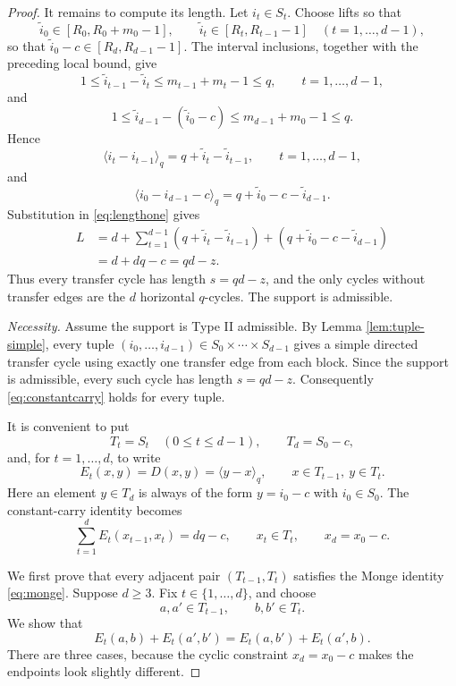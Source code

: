 \documentclass[11pt]{article}
\theoremstyle{definition}
\theoremstyle{remark}
\begin{document}
\begin{proof}
It remains to compute its length.  Let $i_t\in S_t$.  Choose lifts so that
\[
        \widetilde i_0\in [R_0,R_0+m_0-1],
        \qquad
        \widetilde i_t\in [R_t,R_{t-1}-1]\quad(t=1,\ldots,d-1),
\]
so that $\widetilde i_0-c\in [R_d,R_{d-1}-1]$. The interval inclusions, together with the preceding local bound, give
\[
        1\le \widetilde i_{t-1}-\widetilde i_t
        \le m_{t-1}+m_t-1\le q,
        \qquad t=1,\ldots,d-1,
\]
and
\[
        1\le \widetilde i_{d-1}-(\widetilde i_0-c)
        \le m_{d-1}+m_0-1\le q.
\]
Hence
\[
        \langle i_t-i_{t-1}\rangle_q=q+\widetilde i_t-\widetilde i_{t-1},
        \qquad t=1,\ldots,d-1,
\]
and
\[
        \langle i_0-i_{d-1}-c\rangle_q=q+\widetilde i_0-c-\widetilde i_{d-1}.
\]
Substitution in \eqref{eq:lengthone} gives
\[
\begin{aligned}
        L
        &=d+\sum_{t=1}^{d-1}(q+\widetilde i_t-\widetilde i_{t-1})
          +(q+\widetilde i_0-c-\widetilde i_{d-1})  \\
        &=d+dq-c
        =qd-z .
\end{aligned}
\]
Thus every transfer cycle has length $s=qd-z$, and the only cycles without transfer edges are the $d$ horizontal $q$-cycles.  The support is admissible.

\medskip
\noindent\emph{Necessity.}
Assume the support is Type II admissible.  By Lemma \ref{lem:tuple-simple}, every tuple $(i_0,\ldots,i_{d-1})\in S_0\times\cdots\times S_{d-1}$ gives a simple directed transfer cycle using exactly one transfer edge from each block.  Since the support is admissible, every such cycle has length $s=qd-z$.  Consequently \eqref{eq:constantcarry} holds for every tuple.

It is convenient to put
\[
        T_t=S_t\quad(0\le t\le d-1),
        \qquad
        T_d=S_0-c,
\]
and, for $t=1,\ldots,d$, to write
\[
        E_t(x,y)=D(x,y)=\langle y-x\rangle_q,
        \qquad x\in T_{t-1},\ y\in T_t .
\]
Here an element $y\in T_d$ is always of the form $y=i_0-c$ with $i_0\in S_0$.  The constant-carry identity becomes
\begin{equation}
        \sum_{t=1}^d E_t(x_{t-1},x_t)=dq-c,
        \qquad x_t\in T_t,
        \qquad x_d=x_0-c .
        \label{eq:Tconstant}
\end{equation}

We first prove that every adjacent pair $(T_{t-1},T_t)$ satisfies the Monge identity \eqref{eq:monge}.  Suppose $d\ge3$.  Fix $t\in\{1,\ldots,d\}$, and choose
\[
        a,a'\in T_{t-1},
        \qquad
        b,b'\in T_t .
\]
We show that
\[
        E_t(a,b)+E_t(a',b')=E_t(a,b')+E_t(a',b).
\]
There are three cases, because the cyclic constraint $x_d=x_0-c$ makes the endpoints look slightly different.


\end{proof}
\end{document}

